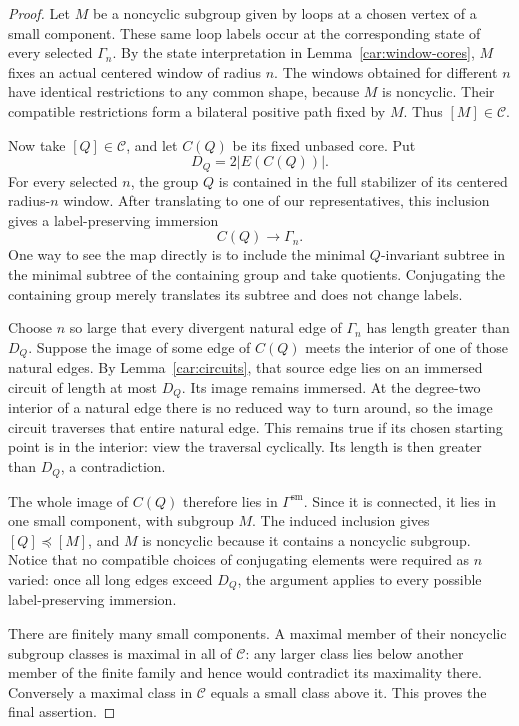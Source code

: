 \begin{proof}
Let $M$ be a noncyclic subgroup given by loops at a chosen vertex
of a small component.  These same loop labels occur at the
corresponding state of every selected $\Gamma_n$.  By the state
interpretation in Lemma~\ref{car:window-cores}, $M$ fixes an actual
centered window of radius $n$.  The windows obtained for different
$n$ have identical restrictions to any common shape, because
$M$ is noncyclic.  Their compatible restrictions form a bilateral
positive path fixed by $M$.  Thus $[M]\in\mathcal C$.

Now take $[Q]\in\mathcal C$, and let $C(Q)$ be its fixed unbased
core.  Put
\[
 D_Q=2|E(C(Q))|.
\]
For every selected $n$, the group $Q$ is contained in the full
stabilizer of its centered radius-$n$ window.  After translating to
one of our representatives, this inclusion gives a label-preserving
immersion
\[
 C(Q)\longrightarrow\Gamma_n.
\]
One way to see the map directly is to include the minimal
$Q$-invariant subtree in the minimal subtree of the containing
group and take quotients.  Conjugating the containing group merely
translates its subtree and does not change labels.

Choose $n$ so large that every divergent natural edge of
$\Gamma_n$ has length greater than $D_Q$.  Suppose the image of
some edge of $C(Q)$ meets the interior of one of those natural edges.  By
Lemma~\ref{car:circuits}, that source edge lies on an immersed
circuit of length at most $D_Q$.  Its image remains immersed.
At the degree-two interior of a natural edge there is no reduced
way to turn around, so the image circuit traverses that entire
natural edge.  This remains true if its chosen starting point is
in the interior: view the traversal cyclically.  Its length is
then greater than $D_Q$, a contradiction.

The whole image of $C(Q)$ therefore lies in
$\Gamma^{\mathrm{sm}}$.  Since it is connected, it lies in one
small component, with subgroup $M$.  The induced inclusion gives
$[Q]\preceq[M]$, and $M$ is noncyclic because it contains a
noncyclic subgroup.  Notice that no compatible choices of
conjugating elements were required as $n$ varied: once all long
edges exceed $D_Q$, the argument applies to every possible
label-preserving immersion.

There are finitely many small components.  A maximal member of
their noncyclic subgroup classes is maximal in all of
$\mathcal C$: any larger class lies below another member of the
finite family and hence would contradict its maximality there.
Conversely a maximal class in $\mathcal C$ equals a small class
above it.  This proves the final assertion.
\end{proof}

